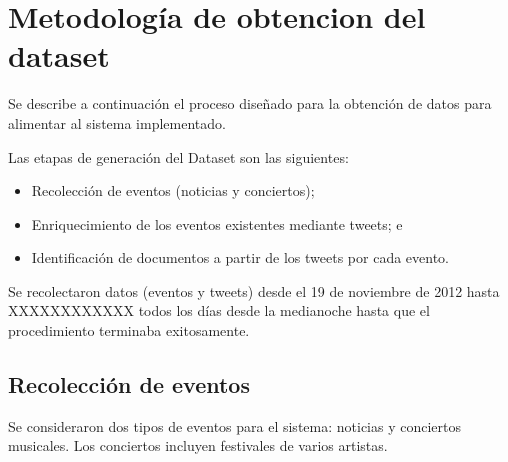 \documentclass[upright, contnum]{umemoria}
\begin{document}
\section{Metodología de obtencion del dataset}
\label{sec-6.2}


Se describe a continuación el proceso diseñado para la obtención de
datos para alimentar al sistema implementado.

Las etapas de generación del Dataset son las siguientes:

\begin{itemize}
\item Recolección de eventos (noticias y conciertos);
\item Enriquecimiento de los eventos existentes mediante tweets; e
\item Identificación de documentos a partir de los tweets por cada evento.
\end{itemize}
Se recolectaron datos (eventos y tweets) desde el 19 de noviembre de
2012 hasta XXXXXXXXXXXX todos los días desde la medianoche hasta que
el procedimiento terminaba exitosamente.

\subsection{Recolección de eventos}
\label{sec-6.2.1}


Se consideraron dos tipos de eventos para el sistema: noticias y
conciertos musicales. Los conciertos incluyen festivales de varios
artistas.
\end{document}
